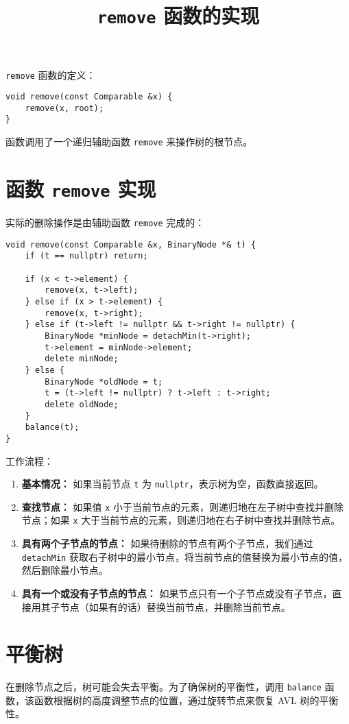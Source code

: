 \documentclass[12pt,a4paper]{article}
\title{ \texttt{remove} 函数的实现}
\author{}
\date{}
\begin{document}
\maketitle



\texttt{remove} 函数的定义：

\begin{verbatim}
void remove(const Comparable &x) {
    remove(x, root);
}
\end{verbatim}

函数调用了一个递归辅助函数 \texttt{remove} 来操作树的根节点。

\section{函数 \texttt{remove} 实现}

实际的删除操作是由辅助函数 \texttt{remove} 完成的：

\begin{verbatim}
void remove(const Comparable &x, BinaryNode *& t) {
    if (t == nullptr) return;

    if (x < t->element) {
        remove(x, t->left);
    } else if (x > t->element) {
        remove(x, t->right);
    } else if (t->left != nullptr && t->right != nullptr) {
        BinaryNode *minNode = detachMin(t->right);
        t->element = minNode->element;
        delete minNode;
    } else {
        BinaryNode *oldNode = t;
        t = (t->left != nullptr) ? t->left : t->right;
        delete oldNode;
    }
    balance(t);
}
\end{verbatim}

工作流程：
\begin{enumerate}
    \item \textbf{基本情况：} 如果当前节点 \texttt{t} 为 \texttt{nullptr}，表示树为空，函数直接返回。
    \item \textbf{查找节点：} 如果值 \texttt{x} 小于当前节点的元素，则递归地在左子树中查找并删除节点；如果 \texttt{x} 大于当前节点的元素，则递归地在右子树中查找并删除节点。
    \item \textbf{具有两个子节点的节点：} 如果待删除的节点有两个子节点，我们通过 \texttt{detachMin} 获取右子树中的最小节点，将当前节点的值替换为最小节点的值，然后删除最小节点。
    \item \textbf{具有一个或没有子节点的节点：} 如果节点只有一个子节点或没有子节点，直接用其子节点（如果有的话）替换当前节点，并删除当前节点。
\end{enumerate}

\section{平衡树}

在删除节点之后，树可能会失去平衡。为了确保树的平衡性，调用 \texttt{balance} 函数，该函数根据树的高度调整节点的位置，通过旋转节点来恢复 AVL 树的平衡性。
\end{document}
